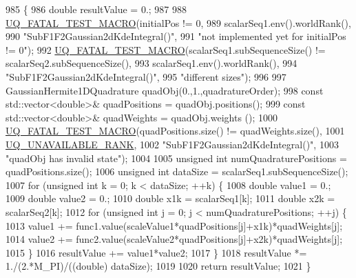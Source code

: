 \begin{DoxyCode}
985 \{
986   \textcolor{keywordtype}{double} resultValue = 0.;
987 
988   \hyperlink{_defines_8h_a56d63d18d0a6d45757de47fcc06f574d}{UQ\_FATAL\_TEST\_MACRO}(initialPos != 0,
989                       scalarSeq1.env().worldRank(),
990                       \textcolor{stringliteral}{"SubF1F2Gaussian2dKdeIntegral()"},
991                       \textcolor{stringliteral}{"not implemented yet for initialPos != 0"});
992   \hyperlink{_defines_8h_a56d63d18d0a6d45757de47fcc06f574d}{UQ\_FATAL\_TEST\_MACRO}(scalarSeq1.subSequenceSize() != scalarSeq2.subSequenceSize(),
993                       scalarSeq1.env().worldRank(),
994                       \textcolor{stringliteral}{"SubF1F2Gaussian2dKdeIntegral()"},
995                       \textcolor{stringliteral}{"different sizes"});
996 
997   GaussianHermite1DQuadrature quadObj(0.,1.,quadratureOrder);
998   \textcolor{keyword}{const} std::vector<double>& quadPositions = quadObj.positions();
999   \textcolor{keyword}{const} std::vector<double>& quadWeights   = quadObj.weights  ();
1000   \hyperlink{_defines_8h_a56d63d18d0a6d45757de47fcc06f574d}{UQ\_FATAL\_TEST\_MACRO}(quadPositions.size() != quadWeights.size(),
1001                       \hyperlink{namespace_q_u_e_s_o_a7d4679800a430ae8e473c1c7bc0bfb21}{UQ\_UNAVAILABLE\_RANK},
1002                       \textcolor{stringliteral}{"SubF1F2Gaussian2dKdeIntegral()"},
1003                       \textcolor{stringliteral}{"quadObj has invalid state"});
1004 
1005   \textcolor{keywordtype}{unsigned} \textcolor{keywordtype}{int} numQuadraturePositions = quadPositions.size();
1006   \textcolor{keywordtype}{unsigned} \textcolor{keywordtype}{int} dataSize = scalarSeq1.subSequenceSize();
1007   \textcolor{keywordflow}{for} (\textcolor{keywordtype}{unsigned} \textcolor{keywordtype}{int} k = 0; k < dataSize; ++k) \{
1008     \textcolor{keywordtype}{double} value1 = 0.;
1009     \textcolor{keywordtype}{double} value2 = 0.;
1010     \textcolor{keywordtype}{double} x1k = scalarSeq1[k];
1011     \textcolor{keywordtype}{double} x2k = scalarSeq2[k];
1012     \textcolor{keywordflow}{for} (\textcolor{keywordtype}{unsigned} \textcolor{keywordtype}{int} j = 0; j < numQuadraturePositions; ++j) \{
1013       value1 += func1.value(scaleValue1*quadPositions[j]+x1k)*quadWeights[j];
1014       value2 += func2.value(scaleValue2*quadPositions[j]+x2k)*quadWeights[j];
1015     \}
1016     resultValue += value1*value2;
1017   \}
1018   resultValue *= 1./(2.*M\_PI)/((\textcolor{keywordtype}{double}) dataSize);
1019 
1020   \textcolor{keywordflow}{return} resultValue;
1021 \}
\end{DoxyCode}


